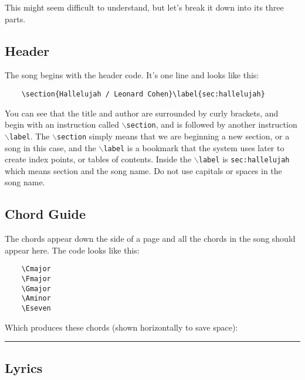 \documentclass[10pt,a4paper]{book}
\newcommand{\Cmajor}{\marginpar{\chord{t}{o,o,o,3}{C}}}
\newcommand{\Fmajor}{\marginpar{\chord{t}{4,3,2,2}{F}}}
\newcommand{\Gmajor}{\marginpar{\chord{t}{o,2,3,2}{G}}}
\newcommand{\Aminor}{\marginpar{\chord{t}{2,o,o,o}{A\large{m}}}}
\newcommand{\Eseven}{\marginpar{\chord{t}{1,2,o,2}{E\large{7}}}}
\begin{document}
This might seem difficult to understand, but let's break it down into its three parts.


\subsection{Header} %
\label{sub:header}

The song begins with the header code. It's one line and looks like this:

\begin{verbatim}
	\section{Hallelujah / Leonard Cohen}\label{sec:hallelujah}
\end{verbatim}

You can see that the title and author are surrounded by curly brackets, and begin with an instruction called \texttt{$\backslash$section}, and is followed by another instruction \texttt{$\backslash$label}. The \texttt{$\backslash$section} simply means that we are beginning a new section, or a song in this case, and the \texttt{$\backslash$label} is a bookmark that the system uses later to create index points, or tables of contents. Inside the \texttt{$\backslash$label} is \texttt{sec:hallelujah} which means section and the song name. Do not use capitals or spaces in the song name.


\subsection{Chord Guide} %
\label{sub:chord_guide}
	
The chords appear down the side of a page and all the chords in the song should appear here. The code looks like this:

\begin{verbatim}
	\Cmajor
	\Fmajor
	\Gmajor
	\Aminor
	\Eseven
\end{verbatim}

Which produces these chords (shown horizontally to save space):\\
\hrule
\hfill {}
\hfill {}
\hfill {}
\hfill {}
\hfill {}


\subsection{Lyrics} %
\label{sub:lyrics}
\end{document}
